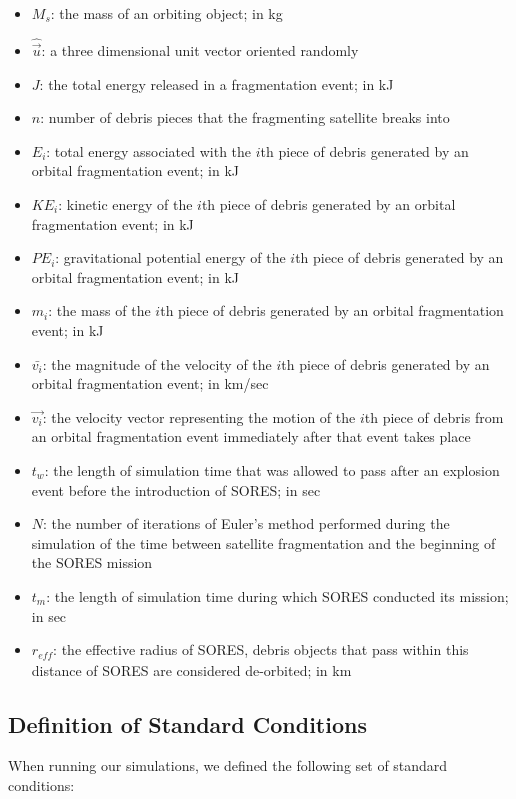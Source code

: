 \documentclass[12pt]{scrartcl}
\begin{document}
\begin{itemize}
    \item $M_{s}$: the mass of an orbiting object; in kg
    \item $\hat{\vec{u}}$: a three dimensional unit vector oriented randomly
    \item $J$: the total energy released in a fragmentation event; in kJ
    \item $n$: number of debris pieces that the fragmenting satellite breaks into 
    \item $E_{i}$: total energy associated with the $i$th piece of debris generated by an orbital fragmentation event; in kJ
    \item $\mathit{KE}_{i}$: kinetic energy of the $i$th piece of debris generated by an orbital fragmentation event; in kJ
    \item $\mathit{PE}_{i}$: gravitational potential energy of the $i$th piece of debris generated by an orbital fragmentation event; in kJ
    \item $m_{i}$: the mass of the $i$th piece of debris generated by an orbital fragmentation event; in kJ
    \item $\bar{v_{i}}$: the magnitude of the velocity of the $i$th piece of debris generated by an orbital fragmentation event; in km/sec
    \item $\vec{v_{i}}$: the velocity vector representing the motion of the $i$th piece of debris from an orbital fragmentation event immediately after that event takes place
    \item $t_{w}$: the length of simulation time that was allowed to pass after an explosion event before the introduction of SORES; in sec
    \item $N$: the number of iterations of Euler's method performed during the simulation of the time between satellite fragmentation and the beginning of the SORES mission
    \item $t_{m}$: the length of simulation time during which SORES conducted its mission; in sec
    \item $r_{\mathit{eff}}$: the effective radius of SORES, debris objects that pass within this distance of SORES are considered de-orbited; in km
    
\end{itemize}

\subsection{Definition of Standard Conditions}
When running our simulations, we defined the following set of standard conditions:
\end{document}
